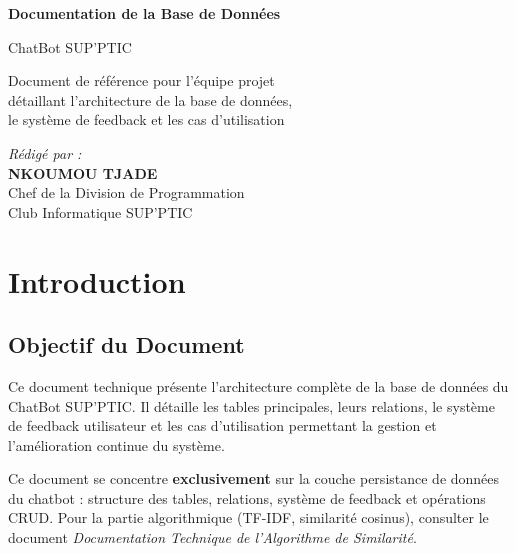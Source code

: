 \documentclass[11pt,a4paper]{article}
\begin{document}
\begin{titlepage}
    \centering
    \vspace*{2cm}
    {\Huge \textbf{Documentation de la Base de Données}} 
    
    \vspace{0.5cm}
    {\Large ChatBot SUP'PTIC} 

    \vspace{1.5cm}
    
    \begin{minipage}{0.8\textwidth}
        \centering
        \small Document de référence pour l'équipe projet \\
        détaillant l'architecture de la base de données, \\
        le système de feedback et les cas d'utilisation
    \end{minipage}
    
    \vspace{2cm}
    
    \begin{minipage}{0.8\textwidth}
        \centering
        \textit{Rédigé par :} \\
        \vspace{0.3cm}
        \textbf{NKOUMOU TJADE} \\
        Chef de la Division de Programmation \\
        Club Informatique SUP'PTIC
    \end{minipage}
    
\end{titlepage}

\tableofcontents
\clearpage

\section{Introduction}
\label{sec:introduction}

\subsection{Objectif du Document}

Ce document technique présente l'architecture complète de la base de données du ChatBot SUP'PTIC. Il détaille les tables principales, leurs relations, le système de feedback utilisateur et les cas d'utilisation permettant la gestion et l'amélioration continue du système.

\begin{important}[Périmètre]
Ce document se concentre \textbf{exclusivement} sur la couche persistance de données du chatbot : structure des tables, relations, système de feedback et opérations CRUD. Pour la partie algorithmique (TF-IDF, similarité cosinus), consulter le document \textit{Documentation Technique de l'Algorithme de Similarité}.
\end{important}
\end{document}
